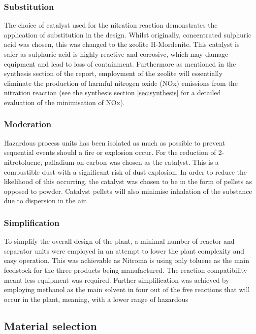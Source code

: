 \subsubsection{Substitution} 
The choice of catalyst used for the nitration reaction demonstrates the application of substitution in the design. Whilst originally, concentrated sulphuric acid was chosen, this was changed to the zeolite H-Mordenite. This catalyst is safer as sulphuric acid is highly reactive and corrosive, which may damage equipment and lead to loss of containment. Furthermore as mentioned in the synthesis section of the report, employment of the zeolite will essentially eliminate the production of harmful nitrogen oxide (NOx) emissions from the nitration reaction (see the synthesis section \ref{sec:synthesis} for a detailed evaluation of the minimisation of NOx).  

\subsubsection{Moderation} 
Hazardous process units has been isolated as much as possible to prevent sequential events should a fire or explosion occur. For the reduction of 2-nitrotoluene,  palladium-on-carbon was chosen as the catalyst. This is a combustible dust with a significant risk of dust explosion. In order to reduce the likelihood of this occurring, the catalyst was chosen to be in the form of pellets as opposed to powder. Catalyst pellets will also minimise inhalation of the substance due to dispersion in the air. 

\subsubsection{Simplification} 
To simplify the overall design of the plant, a minimal number of reactor and separator units were employed in an attempt to lower the plant complexity and easy operation. This was achievable as Nitroma is using only toluene as the main feedstock for the three products being manufactured. The reaction compatibility meant less equipment was required. Further simplification was achieved by employing methanol  as the main solvent in four out of the five reactions that will occur in the plant, meaning, with a lower range of hazardous 

\subsection{Material selection}

